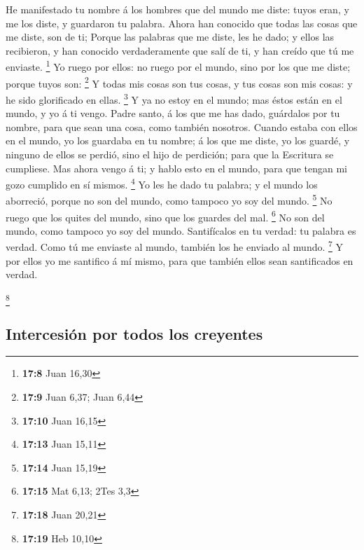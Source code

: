  He manifestado tu nombre á los hombres que del mundo me
diste: tuyos eran, y me los diste, y guardaron tu palabra. 
Ahora han conocido que todas las cosas que me diste, son de ti;
 Porque las palabras que me diste, les he dado; y ellos las
recibieron, y han conocido verdaderamente que salí de ti, y han creído
que tú me enviaste. \footnote{\textbf{17:8} Juan 16,30}  Yo
ruego por ellos: no ruego por el mundo, sino por los que me diste;
porque tuyos son: \footnote{\textbf{17:9} Juan 6,37; Juan 6,44}
 Y todas mis cosas son tus cosas, y tus cosas son mis
cosas: y he sido glorificado en ellas. \footnote{\textbf{17:10} Juan
  16,15}  Y ya no estoy en el mundo; mas éstos están en el
mundo, y yo á ti vengo. Padre santo, á los que me has dado, guárdalos
por tu nombre, para que sean una cosa, como también nosotros.
 Cuando estaba con ellos en el mundo, yo los guardaba en tu
nombre; á los que me diste, yo los guardé, y ninguno de ellos se perdió,
sino el hijo de perdición; para que la Escritura se cumpliese.
 Mas ahora vengo á ti; y hablo esto en el mundo, para que
tengan mi gozo cumplido en sí mismos. \footnote{\textbf{17:13} Juan
  15,11}  Yo les he dado tu palabra; y el mundo los
aborreció, porque no son del mundo, como tampoco yo soy del mundo.
\footnote{\textbf{17:14} Juan 15,19}  No ruego que los
quites del mundo, sino que los guardes del mal. \footnote{\textbf{17:15}
  Mat 6,13; 2Tes 3,3}  No son del mundo, como tampoco yo
soy del mundo.  Santifícalos en tu verdad: tu palabra es
verdad.  Como tú me enviaste al mundo, también los he
enviado al mundo. \footnote{\textbf{17:18} Juan 20,21}  Y
por ellos yo me santifico á mí mismo, para que también ellos sean
santificados en verdad.

\footnote{\textbf{17:19} Heb 10,10}

\hypertarget{intercesiuxf3n-por-todos-los-creyentes}{%
\subsection{Intercesión por todos los
creyentes}\label{intercesiuxf3n-por-todos-los-creyentes}}

